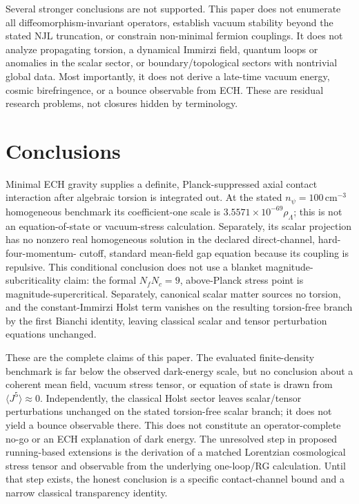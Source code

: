 \documentclass[aps,prd,twocolumn,superscriptaddress,showpacs,preprintnumbers,nofootinbib,longbibliography,floatfix]{revtex4-2}
\begin{document}
Several stronger conclusions are not supported.  This paper does not
enumerate all diffeomorphism-invariant operators, establish vacuum stability
beyond the stated NJL truncation, or constrain non-minimal fermion couplings.
It does not analyze propagating torsion, a dynamical Immirzi field, quantum
loops or anomalies in the scalar sector, or boundary/topological sectors with
nontrivial global data.  Most importantly, it does not derive a late-time
vacuum energy, cosmic birefringence, or a bounce observable from ECH.  These
are residual research problems, not closures hidden by terminology.

\section{Conclusions}\label{sec:conclusions}

Minimal ECH gravity supplies a definite, Planck-suppressed axial contact
interaction after algebraic torsion is integrated out.  At the stated
$n_\psi=100\,\mathrm{cm}^{-3}$ homogeneous benchmark its coefficient-one scale
is $3.5571\times10^{-69}\rho_\Lambda$; this is not an equation-of-state or
vacuum-stress calculation.  Separately, its scalar projection has no nonzero
real homogeneous solution in the declared direct-channel, hard-four-momentum-
cutoff, standard mean-field gap equation because its coupling is repulsive.
This conditional conclusion does not use a blanket magnitude-subcriticality
claim: the formal $N_fN_c=9$, above-Planck stress point is
magnitude-supercritical.  Separately, canonical
scalar matter sources no torsion, and the constant-Immirzi Holst term vanishes
on the resulting torsion-free branch by the first Bianchi identity, leaving
classical scalar and tensor perturbation equations unchanged.

These are the complete claims of this paper.  The evaluated finite-density
benchmark is far below the observed dark-energy scale, but no conclusion about
a coherent mean field, vacuum stress tensor, or equation of state is drawn
from $\langle J^5\rangle\approx0$.  Independently, the classical Holst sector
leaves scalar/tensor perturbations unchanged on the stated torsion-free scalar
branch; it does not yield a bounce observable there.  This does not constitute
an operator-complete no-go or an ECH explanation of dark energy.  The unresolved
step in proposed running-based extensions is the derivation of a matched
Lorentzian cosmological stress tensor and observable from the underlying
one-loop/RG calculation.  Until that step exists, the honest conclusion is a
specific contact-channel bound and a narrow classical transparency identity.
\end{document}
